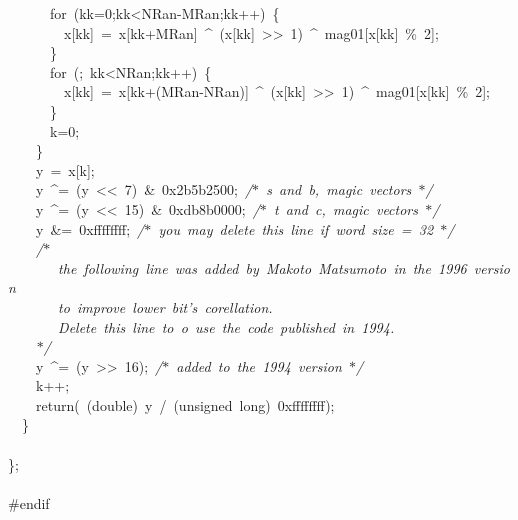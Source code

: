 {\ \ \ \ \ \ for\ (kk=0;kk<{}NRan-{}MRan;kk++)\ \{\\
\ \ \ \ \ \ \ \ x[kk]\ =\ x[kk+MRan]\ \textasciicircum \ (x[kk]\ >{}>{}\ 1)\ \textasciicircum \ mag01[x[kk]\ \%\ 2];\\
\ \ \ \ \ \ \}\\
\ \ \ \ \ \ for\ (;\ kk<{}NRan;kk++)\ \{\\
\ \ \ \ \ \ \ \ x[kk]\ =\ x[kk+(MRan-{}NRan)]\ \textasciicircum \ (x[kk]\ >{}>{}\ 1)\ \textasciicircum \ mag01[x[kk]\ \%\ 2];\\
\ \ \ \ \ \ \}\\
\ \ \ \ \ \ k=0;\\
\ \ \ \ \}\\
\ \ \ \ y\ =\ x[k];\\
\ \ \ \ y\ \textasciicircum =\ (y\ <{}<{}\ 7)\ \&\ 0x2b5b2500;\ \textsl{/$\ast$\ s\ and\ b,\ magic\ vectors\ $\ast$/}\\
\ \ \ \ y\ \textasciicircum =\ (y\ <{}<{}\ 15)\ \&\ 0xdb8b0000;\ \textsl{/$\ast$\ t\ and\ c,\ magic\ vectors\ $\ast$/}\\
\ \ \ \ y\ \&=\ 0xffffffff;\ \textsl{/$\ast$\ you\ may\ delete\ this\ line\ if\ word\ size\ =\ 32\ $\ast$/}\\
\ \ \ \ \textsl{/$\ast$\\
\ \ \ \ \ \ \ the\ following\ line\ was\ added\ by\ Makoto\ Matsumoto\ in\ the\ 1996\ version\\
\ \ \ \ \ \ \ to\ improve\ lower\ bit's\ corellation.\\
\ \ \ \ \ \ \ Delete\ this\ line\ to\ o\ use\ the\ code\ published\ in\ 1994.\\
\ \ \ \ $\ast$/}\\
\ \ \ \ y\ \textasciicircum =\ (y\ >{}>{}\ 16);\ \textsl{/$\ast$\ added\ to\ the\ 1994\ version\ $\ast$/}\\
\ \ \ \ k++;\\
\ \ \ \ return(\ (double)\ y\ /\ (unsigned\ long)\ 0xffffffff);\\
\ \ \}\\
\ \\
\};\\
\ \\
\#endif\\
\ \\
\ \\
 }
\normalfont\normalsize

